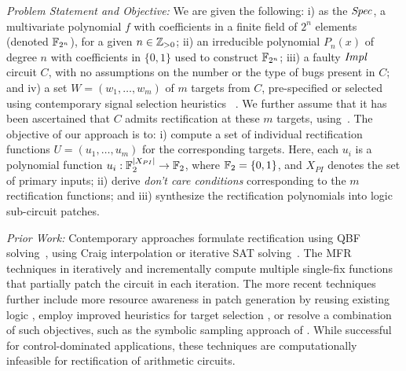 

{\it Problem Statement and Objective:}
We are given the following: i) as the ${\it Spec}$, a multivariate
polynomial $f$ with coefficients in a finite field of $2^n$ elements
(denoted ${\mathbb{F}}_{2^n}$), for a given  $n\in {\mathbb{Z}}_{> 0}$; ii) an irreducible
polynomial $P_n(x)$ of degree $n$ with coefficients in $\{0,1\}$ used 
to construct ${\mathbb{F}}_{2^n}$; iii) a faulty ${\it Impl}$ circuit $C$,
with no assumptions on the number or the type of bugs present in
$C$; and iv) a set $W = (w_1,\dots,w_m)$ of $m$ targets from $C$,
pre-specified or selected using contemporary signal selection heuristics 
~\cite{SS_Alan:DAC18,SS_Fujita:ISCAS19,SS_Roland:DAC19}.
We further assume that it has been ascertained that $C$ 
admits rectification at these $m$ targets, using~\cite{MF_Huang:DATE12,Vkrao:ISQED21}. 
The objective of our approach is to: i) compute a set
of individual rectification functions $U =
(u_1,\dots,u_m)$ for the corresponding targets. Here, each $u_i$ is a 
polynomial function $u_i:{\mathbb{F}}_2^{|X_{PI}|}\rightarrow{\mathbb{F}}_2$, where ${\mathbb{F}}_2=\{0,1\}$, 
and $X_{PI}$ denotes the
set of primary inputs; ii) derive {\it don't care conditions}
corresponding to the $m$ rectification functions; and iii) synthesize
the rectification polynomials into logic sub-circuit patches.


{\it Prior Work:} Contemporary approaches formulate rectification
using QBF solving~\cite{scholl:2}, using Craig interpolation or iterative SAT
solving~\cite{MF_Huang:DATE12}.  
The MFR techniques in 
\cite{SS_Fujita:ISCAS19,MF_Huang:DATE12,SS_Roland:DAC18} 
iteratively and incrementally compute multiple single-fix functions
that partially patch the circuit in each iteration.
The more recent techniques further
include more resource awareness in patch generation by reusing
existing logic \cite{SS_Alan:DAC18}, employ improved heuristics for
target selection \cite{SS_Fujita:ISCAS19}, or resolve a combination of
such objectives, such as the symbolic sampling approach of
\cite{SS_Roland:DAC19}. While
successful for control-dominated applications, these techniques are
computationally infeasible for rectification of arithmetic circuits.

